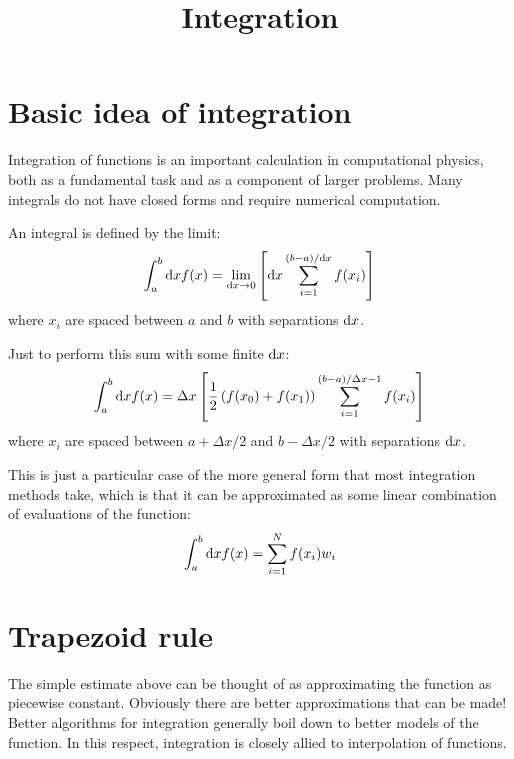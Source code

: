 \title{Integration}

\section{Basic idea of integration}

Integration of functions is an important calculation in computational
physics, both as a fundamental task and as a component of larger
problems. Many integrals do not have closed forms and require
numerical computation.


\begin{answer}
An integral is defined by the limit:
\begin{equation}
\int_a^b {\rm d}x f(x) = \lim_{{\rm d}x \rightarrow 0} \left[{\rm d}x
  \sum_{i=1}^{(b-a)/{\rm d}x} f(x_i) \right]
\end{equation}
where $x_i$ are spaced between $a$ and $b$ with separations ${\rm
  d}x$.
\end{answer}


\begin{answer}
Just to perform this sum with some finite ${\rm d}x$:
\begin{equation}
\int_a^b {\rm d}x f(x) = {\Delta}x \left[
\frac{1}{2} \left(f(x_0) + f(x_1)\right)
\sum_{i=1}^{(b-a)/{\Delta}x - 1} f(x_i) \right]
\end{equation}
where $x_i$ are spaced between $a + \Delta x / 2$ and $b - \Delta x
 /2$ with separations ${\rm d}x$.
\end{answer}

This is just a particular case of the more general form that most
integration methods take, which is that it can be approximated as some
linear combination of evaluations of the function:
\begin{equation}
  \int_a^b {\rm d}x f(x) = \sum_{i=1}^N 
  f(x_i) w_i
\end{equation}

\section{Trapezoid rule}

The simple estimate above can be thought of as approximating the
function as piecewise constant. Obviously there are better
approximations that can be made! Better algorithms for integration
generally boil down to better models of the function. In this respect,
integration is closely allied to interpolation of functions.

